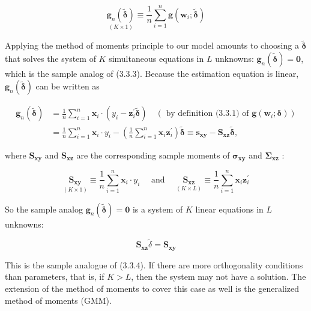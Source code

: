 \documentclass[10pt]{article}
\begin{document}
\begin{equation*}
\underset{(K \times 1)}{\mathbf{g}_{n}(\tilde{\boldsymbol{\delta}})} \equiv \frac{1}{n} \sum_{i=1}^{n} \mathbf{g}\left(\mathbf{w}_{i} ; \tilde{\boldsymbol{\delta}}\right) \tag{3.4.1}
\end{equation*}


Applying the method of moments principle to our model amounts to choosing a $\tilde{\boldsymbol{\delta}}$ that solves the system of $K$ simultaneous equations in $L$ unknowns: $\mathbf{g}_{n}(\tilde{\boldsymbol{\delta}})=\mathbf{0}$, which is the sample analog of (3.3.3). Because the estimation equation is linear, $\mathbf{g}_{n}(\tilde{\boldsymbol{\delta}})$ can be written as


\begin{align*}
\mathbf{g}_{n}(\tilde{\boldsymbol{\delta}}) & =\frac{1}{n} \sum_{i=1}^{n} \mathbf{x}_{i} \cdot\left(y_{i}-\mathbf{z}_{i}^{\prime} \tilde{\boldsymbol{\delta}}\right) \quad\left(\text { by definition (3.3.1) of } \mathbf{g}\left(\mathbf{w}_{i} ; \boldsymbol{\delta}\right)\right) \\
& =\frac{1}{n} \sum_{i=1}^{n} \mathbf{x}_{i} \cdot y_{i}-\left(\frac{1}{n} \sum_{i=1}^{n} \mathbf{x}_{i} \mathbf{z}_{i}^{\prime}\right) \tilde{\boldsymbol{\delta}} \equiv \mathbf{s}_{\mathbf{x y}}-\mathbf{S}_{\mathbf{x z}} \tilde{\boldsymbol{\delta}}, \tag{3.4.2}
\end{align*}


where $\mathbf{S}_{\mathbf{x y}}$ and $\mathbf{S}_{\mathbf{x z}}$ are the corresponding sample moments of $\boldsymbol{\sigma}_{\mathbf{x y}}$ and $\boldsymbol{\Sigma}_{\mathbf{x z}}$ :

$$
\underset{(K \times 1)}{\mathbf{S}_{\mathbf{x y}}} \equiv \frac{1}{n} \sum_{i=1}^{n} \mathbf{x}_{i} \cdot y_{i} \quad \text { and } \quad \underset{(K \times L)}{\mathbf{S}_{\mathbf{x z}}} \equiv \frac{1}{n} \sum_{i=1}^{n} \mathbf{x}_{i} \mathbf{z}_{i}^{\prime}
$$

So the sample analog $\mathbf{g}_{n}(\tilde{\boldsymbol{\delta}})=\mathbf{0}$ is a system of $K$ linear equations in $L$ unknowns:


\begin{equation*}
\mathbf{S}_{\mathbf{x z}} \tilde{\delta}=\mathbf{S}_{\mathbf{x y}} \tag{3.4.3}
\end{equation*}


This is the sample analogue of (3.3.4). If there are more orthogonality conditions than parameters, that is, if $K>L$, then the system may not have a solution. The extension of the method of moments to cover this case as well is the generalized method of moments (GMM).
\end{document}
